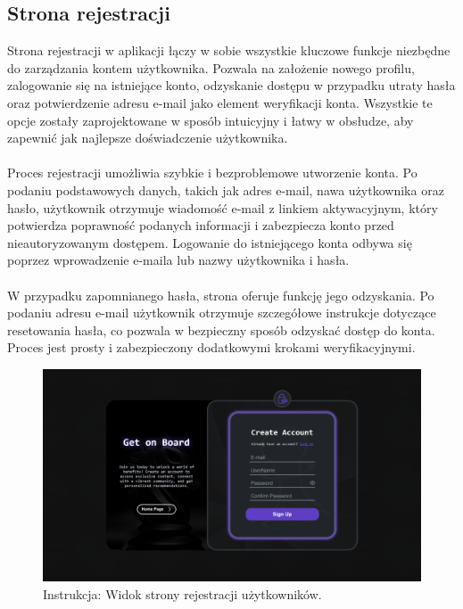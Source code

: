 \documentclass[12pt,a4paper]{article}
\begin{document}
\newpage

\subsection{Strona rejestracji}
Strona rejestracji w aplikacji łączy w sobie wszystkie kluczowe funkcje niezbędne do zarządzania kontem użytkownika. Pozwala na założenie nowego profilu, zalogowanie się na istniejące konto, odzyskanie dostępu w przypadku utraty hasła oraz potwierdzenie adresu e-mail jako element weryfikacji konta. Wszystkie te opcje zostały zaprojektowane w sposób intuicyjny i łatwy w obsłudze, aby zapewnić jak najlepsze doświadczenie użytkownika.
\\\\
Proces rejestracji umożliwia szybkie i bezproblemowe utworzenie konta. Po podaniu podstawowych danych, takich jak adres e-mail, nawa użytkownika oraz hasło, użytkownik otrzymuje wiadomość e-mail z linkiem aktywacyjnym, który potwierdza poprawność podanych informacji i zabezpiecza konto przed nieautoryzowanym dostępem. Logowanie do istniejącego konta odbywa się poprzez wprowadzenie e-maila lub nazwy użytkownika i hasła.
\\\\
W przypadku zapomnianego hasła, strona oferuje funkcję jego odzyskania. Po podaniu adresu e-mail użytkownik otrzymuje szczegółowe instrukcje dotyczące resetowania hasła, co pozwala w bezpieczny sposób odzyskać dostęp do konta. Proces jest prosty i zabezpieczony dodatkowymi krokami weryfikacyjnymi.

\vspace{0.5cm}
\begin{figure}[h!]
    \centering
    \includegraphics[width=1\textwidth]{images/ins_reg.png}
    \caption{Instrukcja: Widok strony rejestracji użytkowników.}
\end{figure}
\vspace{0.5cm}
\end{document}
